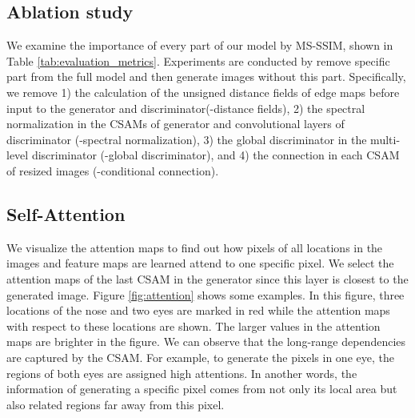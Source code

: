\subsection{Ablation study}
We examine the importance of every part of our model by MS-SSIM, shown in Table \ref{tab:evaluation_metrics}. Experiments are conducted by remove specific part from the full model and then generate images without this part. Specifically, we remove 1) the calculation of the unsigned distance fields of edge maps before input to the generator and discriminator(-distance fields), 2) the spectral normalization in the CSAMs of generator and convolutional layers of discriminator (-spectral normalization), 3) the global discriminator in the multi-level discriminator (-global discriminator), and 4) the connection in each CSAM of resized images (-conditional connection). 
%
\subsection{Self-Attention}
We visualize the attention maps to find out how pixels of all locations in the images and feature maps are learned attend to one specific pixel. We select the attention maps of the last CSAM in the generator since this layer is closest to the generated image.  Figure \ref{fig:attention} shows some examples. In this figure, three locations of the nose and two eyes are marked in red while the attention maps with respect to these locations are shown. The larger values in the attention maps are brighter in the figure. We can observe that the long-range dependencies are captured by the CSAM. For example, to generate the pixels in one eye, the regions of both eyes are assigned high attentions. In another words, the information of generating a specific pixel comes from not only its local area but also related regions far away from this pixel. 
%

%